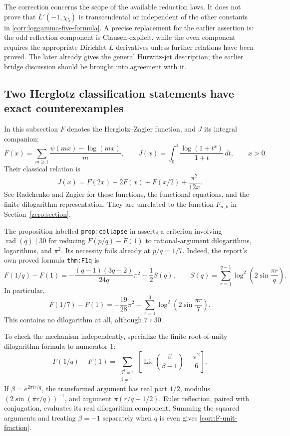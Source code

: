 \documentclass[11pt,a4paper]{article}
\theoremstyle{definition}
\theoremstyle{remark}
\numberwithin{equation}{section}
\begin{document}
The correction concerns the scope of the available reduction laws.
It does not prove that $L'(-1,\chi_5)$ is transcendental or independent
of the other constants in \eqref{corr:loggamma-five-formula}.  A precise
replacement for the earlier assertion is: the odd reflection component
is Clausen-explicit, while the even component requires the appropriate
Dirichlet-$L$ derivatives unless further relations have been proved.
The later  already gives the
general Hurwitz-jet description; the earlier bridge discussion should
be brought into agreement with it.

\subsection{Two Herglotz classification statements have exact counterexamples}
\label{corr:herglotz}

In this subsection $F$ denotes the Herglotz--Zagier function, and
$J$ its integral companion:
\[
 F(x)=\sum_{m\geq1}\frac{\psi(mx)-\log(mx)}{m},\qquad
 J(x)=\int_0^1\frac{\log(1+t^x)}{1+t}\,dt,\qquad x>0.
\]
Their classical relation is
\begin{equation}\label{corr:J-F}
 J(x)=F(2x)-2F(x)+F(x/2)+\frac{\pi^2}{12x}.
\end{equation}
See Radchenko and Zagier \cite{RadchenkoZagier2023} for these functions,
the functional equations, and the finite dilogarithm representation.
They are unrelated to the function $F_{n,k}$ in
Section~\ref{zero:section}.

The proposition labelled \texttt{prop:collapse} in
 asserts a criterion
involving $\operatorname{rad}(q)\mid30$ for reducing $F(p/q)-F(1)$
to rational-argument dilogarithms, logarithms, and $\pi^2$.
Its necessity fails already at $p/q=1/7$.  Indeed, the report's own
proved formula \texttt{thm:F1q} is
\begin{equation}\label{corr:F-unit-fraction}
 F(1/q)-F(1)
 =-\frac{(q-1)(3q-2)}{24q}\pi^2-\frac12 S(q),
 \qquad
 S(q)=\sum_{r=1}^{q-1}\log^2\left(2\sin\frac{\pi r}{q}\right).
\end{equation}
In particular,
\begin{equation}\label{corr:F-seventh}
 F(1/7)-F(1)
   =-\frac{19}{28}\pi^2
      -\sum_{r=1}^{3}\log^2\left(2\sin\frac{\pi r}{7}\right).
\end{equation}
This contains no dilogarithm at all, although $7\nmid30$.

To check the mechanism independently, specialize the finite
root-of-unity dilogarithm formula to numerator $1$:
\[
 F(1/q)-F(1)=
 \sum_{\substack{\beta^q=1\\\beta\ne1}}
   \left[\operatorname{Li}_2\left(\frac{\beta}{\beta-1}\right)
          -\frac{\pi^2}{6}\right].
\]
If $\beta=e^{2\pi i r/q}$, the transformed argument has real part
$1/2$, modulus $(2\sin(\pi r/q))^{-1}$, and argument
$\pi(r/q-1/2)$.  Euler reflection, paired with conjugation, evaluates
its real dilogarithm component.  Summing the squared arguments and
treating $\beta=-1$ separately when $q$ is even gives
\eqref{corr:F-unit-fraction}.
\end{document}
